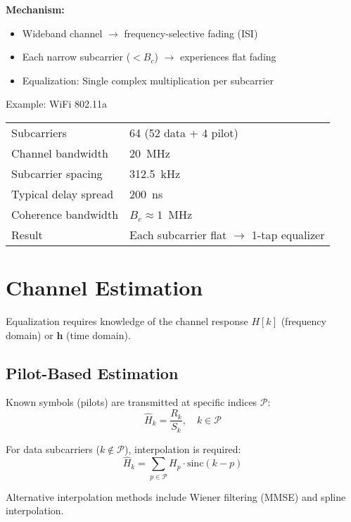 \textbf{Mechanism:}
\begin{itemize}
\item Wideband channel $\rightarrow$ frequency-selective fading (ISI)
\item Each narrow subcarrier ($ < B_c$) $\rightarrow$ experiences flat fading
\item Equalization: Single complex multiplication per subcarrier
\end{itemize}

\begin{calloutbox}{Example: WiFi 802.11a}
\begin{tabular}{@{}ll@{}}
Subcarriers & 64 (52 data + 4 pilot) \\
Channel bandwidth & 20~MHz \\
Subcarrier spacing & 312.5~kHz \\
Typical delay spread & 200~ns \\
Coherence bandwidth & $B_c \approx 1$~MHz \\
Result & Each subcarrier flat $\rightarrow$ 1-tap equalizer \\
\end{tabular}
\end{calloutbox}

\section{Channel Estimation}
\label{sec:channel-estimation}

Equalization requires knowledge of the channel response $H[k]$ (frequency domain) or $\mathbf{h}$ (time domain).

\subsection{Pilot-Based Estimation}

Known symbols (pilots) are transmitted at specific indices $\mathcal{P}$:
\begin{equation}
\hat{H}_k = \frac{R_k}{S_k}, \quad k \in \mathcal{P}
\label{eq:pilot-estimation}
\end{equation}

For data subcarriers ($k \notin \mathcal{P}$), interpolation is required:
\begin{equation}
\hat{H}_k = \sum_{p \in \mathcal{P}} H_p \cdot \text{sinc}(k - p)
\label{eq:pilot-interpolation}
\end{equation}

Alternative interpolation methods include Wiener filtering (MMSE) and spline interpolation.

